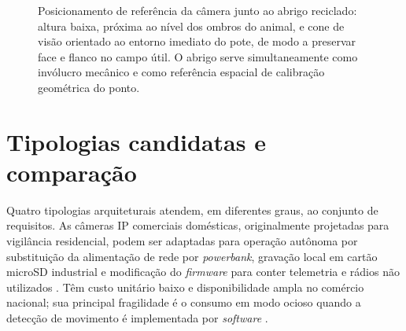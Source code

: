 \begin{figure}[!htb]
  \centering
  \caption[Esquema do posicionamento da câmera junto ao abrigo reciclado.]
  {Posicionamento de referência da câmera junto ao abrigo reciclado: altura baixa, próxima ao nível dos ombros do animal, e cone de visão orientado ao entorno imediato do pote, de modo a preservar face e flanco no campo útil. O abrigo serve simultaneamente como invólucro mecânico e como referência espacial de calibração geométrica do ponto.}
  \label{fig:posicionamento-camera}
\end{figure}


\section{Tipologias candidatas e comparação}
\label{sec:cap2-tipologias}


Quatro tipologias arquiteturais atendem, em diferentes graus, ao conjunto de requisitos. As câmeras IP comerciais domésticas, originalmente projetadas para vigilância residencial, podem ser adaptadas para operação autônoma por substituição da alimentação de rede por \textit{powerbank}, gravação local em cartão microSD industrial e modificação do \textit{firmware} para conter telemetria e rádios não utilizados \cite{openipc2025}. Têm custo unitário baixo e disponibilidade ampla no comércio nacional; sua principal fragilidade é o consumo em modo ocioso quando a detecção de movimento é implementada por \textit{software} \cite{velasco2024smartcameratraps}.


